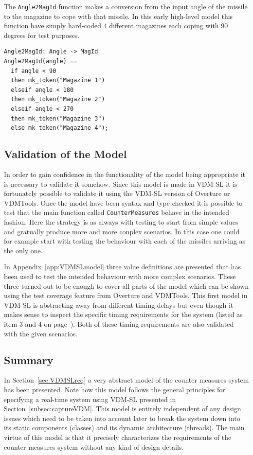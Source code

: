 \documentclass{overturerepchap}
\newcommand{\VDMTools}{VDMTools}
\begin{document}
The \texttt{Angle2MagId} function makes a conversion from the input angle
of the missile to the magazine to cope with that missile. In this early 
high-level model this function have simply hard-coded 4 different magazines
each coping with 90 degrees for test purposes.

\begin{lstlisting}
Angle2MagId: Angle -> MagId
Angle2MagId(angle) ==
  if angle < 90
  then mk_token("Magazine 1")
  elseif angle < 180
  then mk_token("Magazine 2")
  elseif angle < 270
  then mk_token("Magazine 3")
  else mk_token("Magazine 4");
\end{lstlisting}

\subsection{Validation of the Model}

In order to gain confidence in the functionality of the model being 
appropriate it is necessary to validate it somehow. Since this model 
is made in VDM-SL it is fortunately possible to validate it using
the VDM-SL version of Overture or 
\VDMTools. Once the model have been syntax and 
type checked it is possible to test that the main function called
\texttt{CounterMeasures} behave in the intended fashion. Here the strategy
is as always with testing to start from simple values and gratually 
produce more and more conplex scenarios. In this case one could for
example start with testing the behaviour with each of the missiles 
arriving as the only one. 

In Appendix~\ref{app:VDMSLmodel} three 
value definitions are presented that has been used to test the intended
behaviour with more complex scenarios. These three turned out to be 
enough to cover all parts of the model which can be shown using the
test coverage feature from Overture and
\VDMTools. This first model in VDM-SL is
abstracting away from different timing delays but even though it makes
sense to inspect the specific timing requirements for the system 
(listed as item 3 and 4 on page~\pageref{timereq34}). Both of these
timing requirements are also validated with the given scenarios.

\subsection{Summary}

In Section~\ref{sec:VDMSLreq} a very abstract model of the counter
measures system has been presented.  Note how this model follows the
general principles for specifying a real-time system using VDM-SL
presented in Section~\ref{subsec:captureVDM}. This model is entirely
independent of any design issues which need to be taken into account
later to break the system down into its static components (classes)
and its dynamic architecture (threads). The main virtue of this model
is that it precisely characterizes the requirements of the counter
measures system without any kind of design details.
\end{document}
